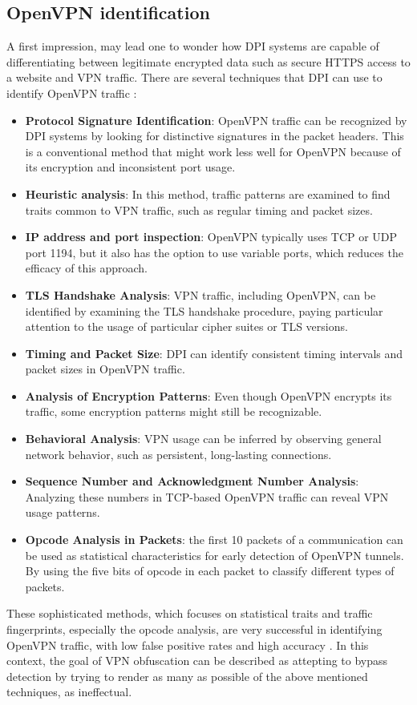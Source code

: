 \documentclass[12pt, fleqn, a4paper]{article}
\begin{document}
\subsection{OpenVPN identification}
A first impression, may lead one to wonder how DPI systems are capable of differentiating between legitimate encrypted data such as secure HTTPS access to a website and VPN traffic. 
There are several techniques that DPI can use to identify OpenVPN traffic \citep{openvpn}:
\begin{itemize}
  \item \textbf{Protocol Signature Identification}: OpenVPN traffic can be recognized by DPI systems by looking for distinctive signatures in the packet headers. This is a conventional method that might work less well for OpenVPN because of its encryption and inconsistent port usage.
  \item \textbf{Heuristic analysis}: In this method, traffic patterns are examined to find traits common to VPN traffic, such as regular timing and packet sizes.
  \item \textbf{IP address and port inspection}: OpenVPN typically uses TCP or UDP port 1194, but it also has the option to use variable ports, which reduces the efficacy of this approach.
  \item \textbf{TLS Handshake Analysis}: VPN traffic, including OpenVPN, can be identified by examining the TLS handshake procedure, paying particular attention to the usage of particular cipher suites or TLS versions.
  \item \textbf{Timing and Packet Size}: DPI can identify consistent timing intervals and packet sizes in OpenVPN traffic.
  \item \textbf{Analysis of Encryption Patterns}: Even though OpenVPN encrypts its traffic, some encryption patterns might still be recognizable.
  \item \textbf{Behavioral Analysis}: VPN usage can be inferred by observing general network behavior, such as persistent, long-lasting connections.
  \item \textbf{Sequence Number and Acknowledgment Number Analysis}: Analyzing these numbers in TCP-based OpenVPN traffic can reveal VPN usage patterns.
  \item \textbf{Opcode Analysis in Packets}: the first 10 packets of a communication can be used as statistical characteristics for early detection of OpenVPN tunnels. By using the five bits of opcode in each packet to classify different types of packets.
\end{itemize}
These sophisticated methods, which focuses on statistical traits and traffic fingerprints, especially the opcode analysis, are very successful in identifying OpenVPN traffic, with low false positive rates and high accuracy \citep{openvpn}. In this context, the goal of VPN obfuscation can be described as attepting to bypass detection by trying to render as many as possible of the above mentioned techniques, as ineffectual.
\end{document}
